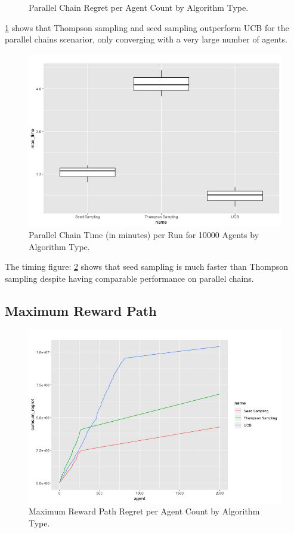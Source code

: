 \documentclass[final]{beamer}
\begin{document}
\begin{frame}[t]
\begin{multicols}{3}
\begin{figure}[htbp!]
  \caption{Parallel Chain Regret per Agent Count by Algorithm Type.}
 \label{fig:pc_results_regret_by_algo}
\end{figure}

\ref{fig:pc_results_regret_by_algo} shows that Thompson sampling and seed sampling outperform UCB for the parallel chains scenarior, only converging with a very large number of agents.

\begin{figure}[htbp!]
  \centering
\includegraphics[scale=.75]{../project_update/pc_max_time_per_ag_by_algo.jpg}

  \caption{Parallel Chain Time (in minutes) per Run for 10000 Agents by Algorithm Type.}
 \label{fig:pc_max_time_per_ag_by_algo}
\end{figure}
The timing figure: \ref{fig:pc_max_time_per_ag_by_algo} shows that seed sampling is much faster than Thompson sampling despite having comparable performance on parallel chains.

\subsection{Maximum Reward Path}
\begin{figure}[htbp!]
  \centering
\includegraphics[scale=.75]{../project_update/mr_regret_per_ag_per_algo.jpg}
  \caption{Maximum Reward Path Regret per Agent Count by Algorithm Type.}
 \label{fig:mr_regret_per_ag_per_algo}
\end{figure}


\end{multicols}
\end{frame}
\end{document}

